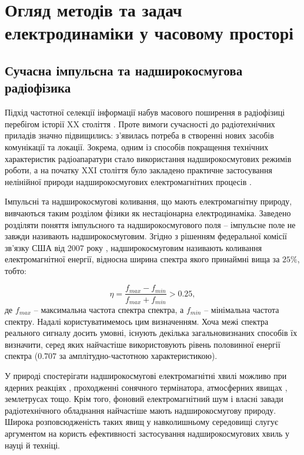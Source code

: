 \chapter{Огляд методів та задач електродинаміки у часовому просторі}
\label{ch:review}

\section{Сучасна імпульсна та надширокосмугова радіофізика}

Підхід частотної селекції інформації набув масового поширення в радіофізиці
перебігом історії XX століття \cite{imp:Nosich2001}. Проте вимоги 
сучасності до радіотехнічних приладів значно підвищились: з'явилась потреба 
в створенні нових засобів комунікації та локації. Зокрема, одним із 
способів покращення технічних характеристик радіоапаратури стало 
використання надширокосмугових режимів роботи, а на початку XXI 
століття було закладено практичне застосування нелінійної природи 
надширокосмугових електромагнітних процесів \cite{imp:Chernogor2008}.

Імпульсні та надширокосмугові коливання, що мають електромагнітну природу, 
вивчаються таким розділом фізики як нестаціонарна електродинаміка. Заведено 
розділяти поняття імпульсного та надширокосмугового поля -- імпульсне поле 
не завжди називають надширокосмуговим. Згідно з рішенням федеральної 
комісії зв'язку США від 2007 року \cite{imp:RadarStandard2007}, 
надширокосмуговим називають коливання електромагнітної енергії, 
відносна ширина спектра якого принаймні вища за $ 25\% $, тобто:

\begin{equation} \label{eq:spectum_width}
\eta = \frac{f_{max} - f_{min}}{f_{max} + f_{min}} > 0.25,
\end{equation}
%
де $ f_{max} $ -- максимальна частота спектра спектра, а $ f_{min} $ -- 
мінімальна частота спектру. Надалі користуватимемось цим визначенням. 
Хоча межі спектра реального сигналу досить умовні, існують декілька 
загальновизнаних способів їх визначити, серед яких найчастіше 
використовують рівень половинної енергії спектра ($ 0.707 $ за 
амплітудно-частотною характеристикою).

У природі спостерігати надширокосмугові електромагнітні хвилі можливо при 
ядерних реакціях \cite{imp:Baum2007}, проходженні сонячного термінатора, 
атмосферних явищах \cite{imp:Uman2006}, землетрусах 
\cite{imp:Hayakawa2008} тощо. Крім того, фоновий електромагнітний шум і 
власні завади радіотехнічного обладнання найчастіше мають 
надширокосмугову природу. Широка розповсюдженість таких явищ у 
навколишньому середовищі слугує аргументом на користь ефективності 
застосування надширокосмугових хвиль у науці й техніці.

